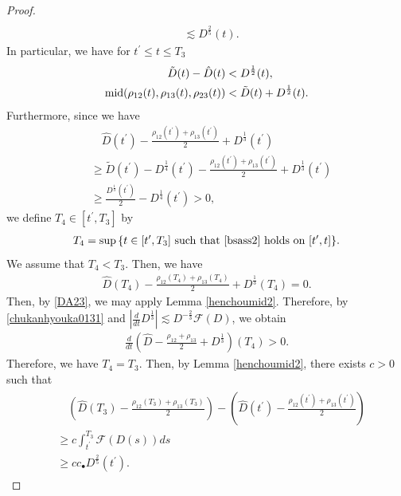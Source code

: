 \documentclass[reqno]{amsart}
\theoremstyle{plain}
\theoremstyle{definition}
\numberwithin{equation}{section}
\newcommand{\m}{\mbox{\textnormal{mid}}}
\newcommand{\1}{\mathbbm{1}}
\begin{document}
\begin{proof}
\begin{align*}
\\
&\lesssim D^{\frac{2}{5}}(t).
\end{align*}
In particular, we have for $t^{\prime}\leq t\leq T_3$
\begin{align}\label{DA23}
\begin{aligned}
\tilde{D}(t)-\hat{D}(t)&<D^{\frac{1}{2}}(t),
\\
\m{(\rho_{12}(t),\rho_{13}(t),\rho_{23}(t))}&<\tilde{D}(t)+D^{\frac{1}{2}}(t).
\end{aligned}
\end{align}
Furthermore, since we have
\begin{align*}
&\quad \hat{D}(t^{\prime})-\frac{\rho_{12}(t^{\prime})+\rho_{13}(t^{\prime})}{2}+D^{\frac{1}{3}}(t^{\prime})
\\
&\geq \tilde{D}(t^{\prime})-D^{\frac{1}{4}}(t^{\prime})-\frac{\rho_{12}(t^{\prime})+\rho_{13}(t^{\prime})}{2}+D^{\frac{1}{3}}(t^{\prime})
\\
&\geq \frac{D^{\frac{1}{3}}(t^{\prime})}{2}-D^{\frac{1}{4}}(t^{\prime})>0,
\end{align*}
we define $T_4\in [t^{\prime},T_3]$ by
\begin{align}\label{bs1sono2}
T_4=\sup{\{t\in[t^{\prime},T_3]\ \mbox{such that \eqref{bsass2} holds on}\ [t^{\prime},t]\}}.
\end{align}
We assume that $T_4<T_3$. Then, we have 
\begin{align*}
\hat{D}(T_4)-\frac{\rho_{12}(T_4)+\rho_{13}(T_4)}{2}+D^{\frac{1}{3}}(T_4)=0.
\end{align*}
Then, by \eqref{DA23}, we may apply Lemma \ref{henchoumid2}. Therefore, by \eqref{chukanhyouka0131} and $|\frac{d}{dt}D^{\frac{1}{3}}|\lesssim D^{-\frac{2}{3}}\mathcal{F}(D)$, we obtain
\begin{align*}
\frac{d}{dt}\left(\hat{D}-\frac{\rho_{12}+\rho_{13}}{2}+D^{\frac{1}{3}}\right)(T_4)>0.
\end{align*}
Therefore, we have $T_4=T_3$. Then, by Lemma \ref{henchoumid2}, there exists $c>0$ such that 
\begin{align}\label{DA25}
\begin{aligned}
&\quad \left(\hat{D}(T_3)-\frac{\rho_{12}(T_3)+\rho_{13}(T_3)}{2}\right)-\left(\hat{D}(t^{\prime})-\frac{\rho_{12}(t^{\prime})+\rho_{13}(t^{\prime})}{2}\right)
\\
&\geq c\int_{t^{\prime}}^{T_3}\mathcal{F}(D(s))ds
\\
&\geq  cc_{\bullet}D^{\frac{2}{5}}(t^{\prime}).
\end{aligned}
\end{align}

\end{proof}
\end{document}
